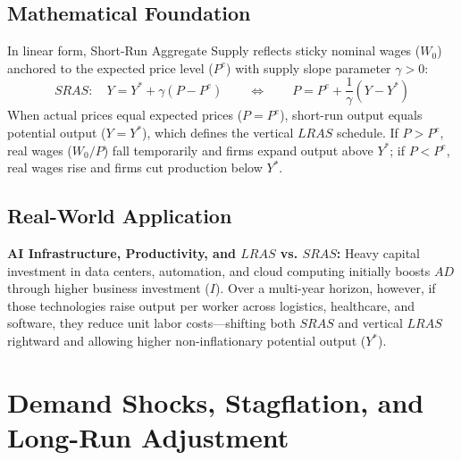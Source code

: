 \documentclass[11pt,letterpaper]{article}
\begin{document}
\subsection*{Mathematical Foundation}
In linear form, Short-Run Aggregate Supply reflects sticky nominal wages ($W_0$) anchored to the expected price level ($P^e$) with supply slope parameter $\gamma > 0$:
\[
SRAS: \quad Y = Y^* + \gamma (P - P^e) \qquad \Longleftrightarrow \qquad P = P^e + \frac{1}{\gamma}(Y - Y^*)
\]
When actual prices equal expected prices ($P = P^e$), short-run output equals potential output ($Y = Y^*$), which defines the vertical $LRAS$ schedule. If $P > P^e$, real wages ($W_0 / P$) fall temporarily and firms expand output above $Y^*$; if $P < P^e$, real wages rise and firms cut production below $Y^*$.

\subsection*{Real-World Application}
\textbf{AI Infrastructure, Productivity, and $LRAS$ vs. $SRAS$:} Heavy capital investment in data centers, automation, and cloud computing initially boosts $AD$ through higher business investment ($I$). Over a multi-year horizon, however, if those technologies raise output per worker across logistics, healthcare, and software, they reduce unit labor costs—shifting both $SRAS$ and vertical $LRAS$ rightward and allowing higher non-inflationary potential output ($Y^*$).

\section{Demand Shocks, Stagflation, and Long-Run Adjustment}
\end{document}
